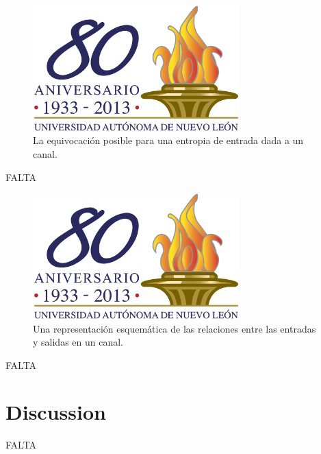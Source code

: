 \begin{figure}[!ht]
\centerline{\includegraphics[width=80mm]{ejemplo.png}}
\caption{La equivocaci\'{o}n posible para una entropia de entrada dada
  a un canal.}
\label{fig:9}
\end{figure}

FALTA

\begin{figure}[!ht]
\centerline{\includegraphics[width=80mm]{ejemplo.png}}
\caption{Una representaci\'{o}n esquem\'{a}tica de las relaciones
  entre las entradas y salidas en un canal.}
\label{fig:10}
\end{figure}

FALTA

\clearpage

\chapter{Discussion}
\label{sec:14}

FALTA


